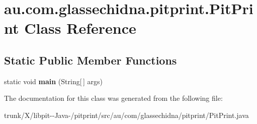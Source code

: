 \hypertarget{classau_1_1com_1_1glassechidna_1_1pitprint_1_1PitPrint}{\section{au.\-com.\-glassechidna.\-pitprint.\-Pit\-Print Class Reference}
\label{classau_1_1com_1_1glassechidna_1_1pitprint_1_1PitPrint}
}
\subsection*{Static Public Member Functions}
\begin{DoxyCompactItemize}
\item 
\hypertarget{classau_1_1com_1_1glassechidna_1_1pitprint_1_1PitPrint_ad971cc420d2df39a07d98fcb056bee26}{static void {\bfseries main} (String\mbox{[}$\,$\mbox{]} args)}\label{classau_1_1com_1_1glassechidna_1_1pitprint_1_1PitPrint_ad971cc420d2df39a07d98fcb056bee26}

\end{DoxyCompactItemize}


The documentation for this class was generated from the following file\-:\begin{DoxyCompactItemize}
\item 
trunk/\-X/libpit-\/-\/\-Java-\//pitprint/src/au/com/glassechidna/pitprint/Pit\-Print.\-java\end{DoxyCompactItemize}
